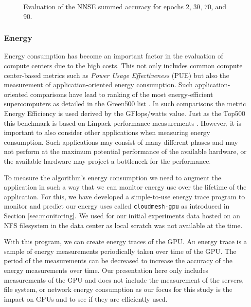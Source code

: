 \documentclass[utf8]{FrontiersinVancouver} %
\begin{document}
\begin{figure}[p]
\begin{center}
  \end{center}

  \caption {Evaluation of the NNSE summed accuracy for epochs 2, 30, 70, and 90.}
  \label{fig:NNSE-comparison-a100-summed}

\end{figure}

\subsubsection{Energy}
\label{sec:perf-energy}


Energy consumption has become an important factor in the evaluation of
compute centers due to the high costs. This not only includes common
compute center-based metrics such as {\em Power Usage Effectiveness} (PUE) 
but also the measurement of application-oriented energy consumption. 
Such application-oriented comparisons have lead to ranking of the most
energy-efficient supercomputers as detailed in the Green500 list
\citep{green500}. In such comparisons the metric Energy Efficiency is used derived by the GFlops/watts value. Just as the Top500 this benchmark is based on Linpack performance measurements \cite{www-top500}.
However, it is important to also consider other applications when measuring energy consumption. Such applications may consist of many different phases and may not perform at the maximum potential performance of the available hardware, or the available hardware may project a bottleneck for the performance. 

To measure the  algorithm's energy consumption we need to augment the application in such a way that we can monitor energy use over the lifetime of the application. For this, we have developed a simple-to-use energy trace program to monitor and
predict our energy uses called \verb|cloudmesh-gpu| as introduced in Section \ref{sec:monitoring}.
We used for our initial experiments data hosted on an NFS filesystem in the data center as local scratch was not available at the time.


With this program, we can create energy traces of the GPU. An energy trace is a sample of energy measurements periodically taken over time of the GPU. The period of the measurements can be decreased to increase the accuracy of the energy measurements over time. Our presentation here only includes measurements of the GPU and does not include the measurement of the servers, file system, or network energy consumption as our focus for this study is the impact on GPUs and to see if they are efficiently used.
\end{document}
